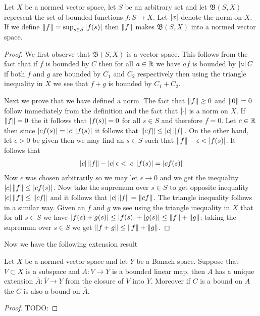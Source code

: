 \begin{prop}Let $X$ be a normed vector space, let $S$ be an arbitrary
  set and let $\mathfrak{B}(S, X)$
  represent the set of bounded functions $f : S \to X$.  Let
  $\left \vert x \right \vert$ denote the norm on $X$.  If we
  define $\left \lVert f \right \rVert = \sup_{s \in S} \left \vert f(s) \right \vert$ then $\left \lVert f \right \rVert$
  makes $\mathfrak{B}(S, X)$ into a normed vector space.
\end{prop}
\begin{proof}
We first observe that $\mathfrak{B}(S, X)$ is a vector space.  
This follows from the fact that if $f$ is bounded by $C$ then for all
$a \in \mathbb{R}$ we have $af$ is bounded by $\left \vert a \right \vert C$ if both $f$ and
$g$ are bounded by $C_1$ and $C_2$ respectively then using the
triangle inequality in $X$ we see that $f+g$ is bounded by $C_1 + C_2$.

Next we prove that we have defined a norm.  The fact that $\left \lVert f \right \rVert
\geq 0$ and $\left \lVert 0 \right \rVert =0$ follow immediately from the definition and
the fact that $\left \vert \cdot \right \vert$ is a norm on $X$.   If $\left \lVert f \right \rVert
= 0$ the it follows that $\left \vert f(s) \right \vert = 0$ for all $s \in S$
and therefore $f=0$.  Let $c \in \mathbb{R}$ then since $\left \vert cf(s) \right \vert =
\left \vert c \right \vert \left \vert f(s) \right \vert$ it follows that $\left \lVert cf \right \rVert \leq \left \vert c \right \vert\left \lVert f \right \rVert$.
On the other hand, let $\epsilon > 0$ be given then we may find an $s
\in S$
such that $\left \lVert f \right \rVert - \epsilon < \left \vert f(s) \right \vert$.  It follows that 
\begin{align*}
\left \vert c \right \vert \left \lVert f \right \rVert - \left \vert c \right \vert \epsilon < \left \vert c \right \vert \left \vert f(s) \right \vert = \left \vert cf(s) \right \vert
\end{align*}
Now $\epsilon$ was chosen arbitrarily so we may let $\epsilon \to 0$
and we get the inequality $\left \vert c \right \vert \left \lVert f \right \rVert \leq
\left \vert cf(s) \right \vert$.  Now take the supremum over $s \in S$ to get opposite
inequality $\left \vert c \right \vert \left \lVert f \right \rVert \leq \left \lVert cf \right \rVert$ and it follows that
$\left \vert c \right \vert \left \lVert f \right \rVert = \left \lVert cf \right \rVert$.  The triangle inequality follows in a
similar way.  Given an $f$ and $g$ we see using the triangle
inequality in $X$ that for all $s \in S$ we
have $\left \vert f(s) + g(s) \right \vert \leq \left \vert f(s) \right \vert + \left \vert g(s) \right \vert \leq \left \lVert f \right \rVert
+\left \lVert g \right \rVert$; taking the supremum over $s \in S$ we get $\left \lVert f+g \right \rVert \leq
\left \lVert f \right \rVert + \left \lVert g \right \rVert$.
\end{proof}

Now we have the following extension result
\begin{lem}Let $X$ be a normed vector space and let $Y$ be a Banach
  space.  Suppose that $V \subset X$ is a subspace and $A : V \to Y$
  is a bounded linear map, then $A$ has a unique extension
  $\overline{A} : \overline{V} \to Y$ from the closure of $V$ into
  $Y$.  Moreover if $C$ is a bound on $A$ the $C$ is also a bound on $\overline{A}$.
\end{lem}
\begin{proof}
TODO:
\end{proof}


